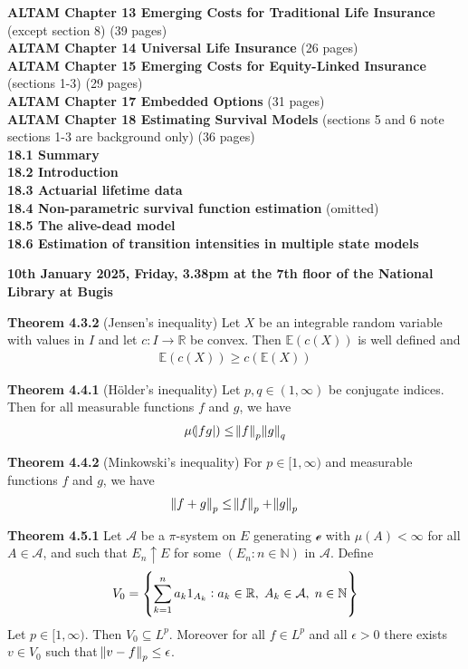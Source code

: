 \documentclass[hidelinks, 12pt]{article}
\theoremstyle{mydefstyle}
\theoremstyle{mythmstyle}
\begin{document}
\textbf{ALTAM Chapter 13 Emerging Costs for Traditional Life Insurance} (except section 8) (39 pages) \\

\textbf{ALTAM Chapter 14 Universal Life Insurance} (26 pages) \\

\textbf{ALTAM Chapter 15 Emerging Costs for Equity-Linked Insurance} (sections 1-3) (29 pages) \\

\textbf{ALTAM Chapter 17 Embedded Options} (31 pages) \\

\textbf{ALTAM Chapter 18 Estimating Survival Models} (sections 5 and 6 note sections 1-3 are background only) (36 pages) \\
\textbf{18.1 Summary} \\
\textbf{18.2 Introduction} \\
\textbf{18.3 Actuarial lifetime data} \\
\textbf{18.4 Non-parametric survival function estimation} (omitted) \\
\textbf{18.5 The alive-dead model} \\
\textbf{18.6 Estimation of transition intensities in multiple state models} 

\newpage

\textbf{10th January 2025, Friday, 3.38pm at the 7th floor of the National Library at Bugis}

\textbf{Theorem 4.3.2} (Jensen's inequality) Let $X$ be an integrable random variable with values in $I$ and let $c : I \to \mathbb{R}$ be convex. Then $\mathbb{E}(c(X))$ is well defined and
\begin{gather*}
\mathbb{E}(c(X)) \ge c(\mathbb{E}(X))
\end{gather*}

\textbf{Theorem 4.4.1} (H{\"o}lder's inequality) Let $p, q \in (1, \infty)$ be conjugate indices. Then for all measurable functions $f$ and $g$, we have
\begin{gather*}
\mu(\abs{fg}) \le \norm{f}_p \norm{g}_q
\end{gather*}

\textbf{Theorem 4.4.2} (Minkowski's inequality) For $p \in [1, \infty)$ and measurable functions $f$ and $g$, we have
\begin{gather*}
\norm{f + g}_p \le \norm{f}_p + \norm{g}_p
\end{gather*}

\textbf{Theorem 4.5.1} Let $\mathcal{A}$ be a $\pi$-system on $E$ generating $\mathcal{e}$ with $\mu(A) < \infty$ for all $A \in \mathcal{A}$, and such that $E_n \uparrow E$ for some $(E_n : n \in \mathbb{N})$ in $\mathcal{A}$. Define
\begin{gather*}
V_0 = \left\{ \sum_{k = 1}^n a_k 1_{A_k} : a_k \in \mathbb{R}, \hspace{1mm} A_k \in \mathcal{A}, \hspace{1mm} n \in \mathbb{N} \right\}
\end{gather*}
Let $p \in [1, \infty)$. Then $V_0 \subseteq L^p$. Moreover for all $f \in L^p$ and all $\epsilon > 0$ there exists $v \in V_0$ such that $\norm{v - f}_p \le \epsilon$. 
\end{document}
